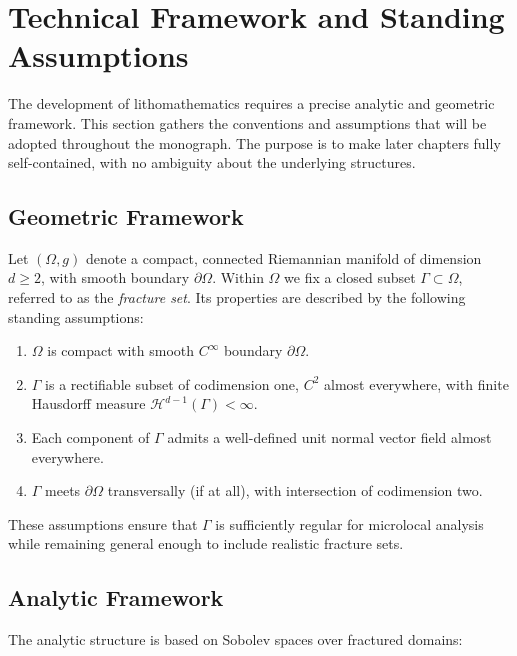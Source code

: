 \section{Technical Framework and Standing Assumptions}

The development of lithomathematics requires a precise analytic and geometric
framework. This section gathers the conventions and assumptions that will be
adopted throughout the monograph. The purpose is to make later chapters fully
self-contained, with no ambiguity about the underlying structures.

\subsection{Geometric Framework}

Let $(\Omega,g)$ denote a compact, connected Riemannian manifold of dimension
$d\geq 2$, with smooth boundary $\partial\Omega$. Within $\Omega$ we fix a
closed subset $\Gamma \subset \Omega$, referred to as the \emph{fracture set}.
Its properties are described by the following standing assumptions:

\begin{enumerate}[label=(G\arabic*)]
  \item $\Omega$ is compact with smooth $C^\infty$ boundary $\partial\Omega$.
  \item $\Gamma$ is a rectifiable subset of codimension one, $C^2$ almost
  everywhere, with finite Hausdorff measure
  $\mathcal{H}^{d-1}(\Gamma)<\infty$.
  \item Each component of $\Gamma$ admits a well-defined unit normal vector
  field almost everywhere.
  \item $\Gamma$ meets $\partial\Omega$ transversally (if at all), with
  intersection of codimension two.
\end{enumerate}

These assumptions ensure that $\Gamma$ is sufficiently regular for microlocal
analysis while remaining general enough to include realistic fracture sets.

\subsection{Analytic Framework}

The analytic structure is based on Sobolev spaces over fractured domains:

